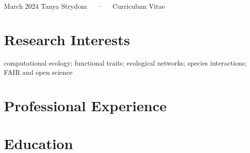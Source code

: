 \documentclass[11pt,a4paper,]{awesome-cv}
\begin{document}
\makecvheader

\makecvfooter
  {March 2024}
    {Tanya Strydom~~~·~~~Curriculum Vitae}
  {\thepage}





\section{\texorpdfstring{ Research
Interests}{ Research Interests}}\label{research-interests}

computational ecology; functional traits; ecological networks; species
interactions; FAIR and open science

\section{\texorpdfstring{ Professional
Experience}{ Professional Experience}}\label{professional-experience}

\begin{cventries}
\end{cventries}

\section{\texorpdfstring{
Education}{ Education}}\label{education}
\end{document}
